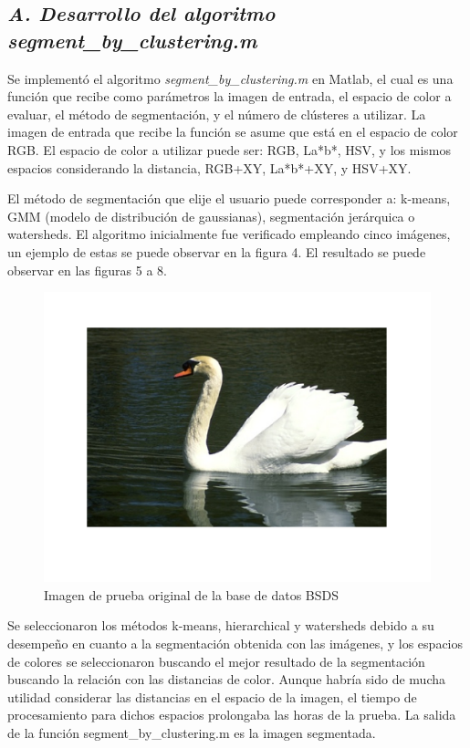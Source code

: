 \documentclass[10pt,twocolumn,letterpaper]{article}
\begin{document}
\subsection{ \textit{A. Desarrollo del algoritmo \textit{segment\_by\_clustering.m}}}
Se implementó el algoritmo \textit{segment\_by\_clustering.m }en Matlab, el cual es una función que recibe como parámetros la imagen de entrada, el espacio de color a evaluar, el método de segmentación, y el número de clústeres a utilizar. La imagen de entrada que recibe la función se asume que está en el espacio de color RGB. El espacio de color a utilizar puede ser: RGB, La*b*, HSV, y los mismos espacios considerando la distancia, RGB+XY, La*b*+XY, y HSV+XY. 

El método de segmentación que elije el usuario puede corresponder a: k-means, GMM (modelo de distribución de gaussianas), segmentación jerárquica o watersheds.  El algoritmo inicialmente fue verificado empleando cinco imágenes, un ejemplo de estas se puede observar en la figura 4. El resultado se puede observar en las figuras 5 a 8.

\begin{figure}[H]
\begin{center}
   \includegraphics[scale = 0.45]{imagenPrueba}
\end{center}
   \caption{Imagen de prueba original de la base de datos BSDS}
\end{figure}

Se seleccionaron los métodos k-means, hierarchical y watersheds debido a su desempeño en cuanto a la segmentación obtenida con las imágenes, y los espacios de colores se seleccionaron buscando el mejor resultado de la segmentación buscando la relación con las distancias de color. Aunque habría sido de mucha utilidad considerar las distancias en el espacio de la imagen, el tiempo de procesamiento para dichos espacios prolongaba las horas de la prueba. La salida de la función segment_by_clustering.m es la imagen segmentada.
\end{document}

